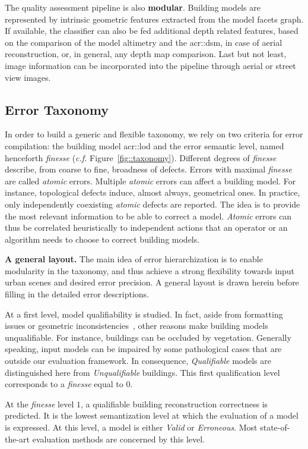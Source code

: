 \documentclass[runningheads]{llncs}
\begin{document}
The quality assessment pipeline is also \textbf{modular}. Building models are represented by intrinsic geometric features extracted from the model facets graph. If available, the classifier can also be fed additional depth related features, based on the comparison of the model altimetry and the \acrfull{acr::dsm}, in case of aerial reconstruction, or, in general, any depth map comparison. Last but not least, image information can be incorporated into the pipeline through aerial or street view images.

\subsection{Error Taxonomy}
In order to build a generic and flexible taxonomy, we rely on two criteria for error compilation: the building model \acrshort{acr::lod} and the error semantic level, named henceforth \textit{finesse} (\textit{c.f.} Figure~\ref{fig::taxonomy}). Different degrees of \textit{finesse} describe, from coarse to fine, broadness of defects. Errors with maximal \textit{finesse} are called \textit{atomic} errors. Multiple \textit{atomic} errors can affect a building model. For instance, topological defects induce, almost always, geometrical ones. In practice, only independently coexisting \textit{atomic} defects are reported. The idea is to provide the most relevant information to be able to correct a model. \textit{Atomic} errors can thus be correlated heuristically to independent actions that an operator or an algorithm needs to choose to correct building models.

\noindent
\textbf{A general layout.}
The main idea of error hierarchization is to enable modularity in the taxonomy, and thus achieve a strong flexibility towards input urban scenes and desired error precision. A general layout is drawn herein before filling in the detailed error descriptions.

At a first level, model qualifiability is studied. In fact, aside from formatting issues or geometric inconsistencies~\cite{ledoux2018val3dity}, other reasons make building models unqualifiable. For instance, buildings can be occluded by vegetation. Generally speaking, input models can be impaired by some pathological cases that are outside our evaluation framework. In consequence, \textit{Qualifiable} models are distinguished here from \textit{Unqualifiable} buildings. This first qualification level corresponds to a \textit{finesse} equal to $0$.

At the \textit{finesse} level $1$, a qualifiable building reconstruction correctness is predicted. It is the lowest semantization level at which the evaluation of a model is expressed. At this level, a model is either \textit{Valid} or \textit{Erroneous}. Most state-of-the-art evaluation methods are concerned by this level.
\end{document}
